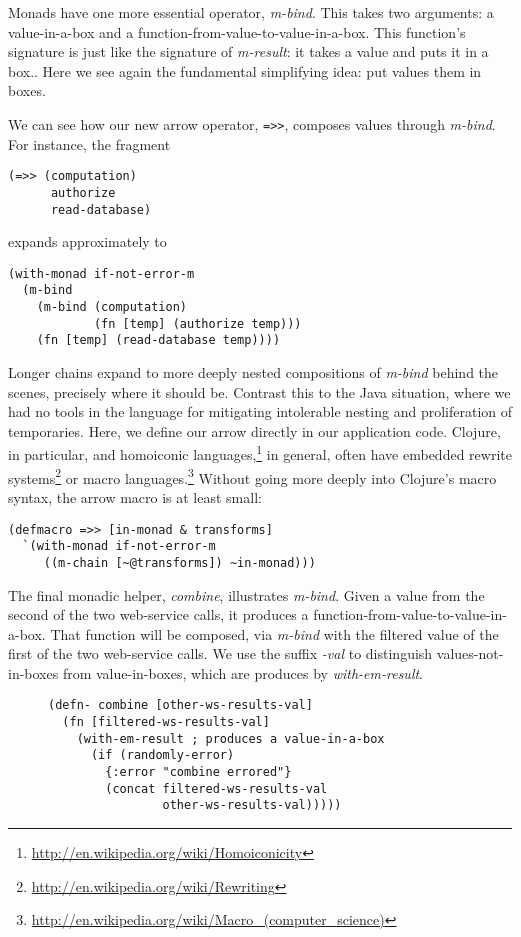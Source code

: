 \documentclass[11pt]{article}
\begin{document}
Monads have one more essential operator, \emph{m-bind}. This takes two
arguments: a value-in-a-box and a
function-from-value-to-value-in-a-box. This function's signature is
just like the signature of \emph{m-result}: it takes a value and puts it
in a box.. Here we see again the fundamental simplifying idea: put
values them in boxes.

We can see how our new arrow operator, \verb|=>>|, composes values
through \emph{m-bind}. For instance, the fragment

\begin{verbatim}
(=>> (computation)
      authorize
      read-database)
\end{verbatim}
expands approximately to
\begin{verbatim}
(with-monad if-not-error-m
  (m-bind
    (m-bind (computation)
            (fn [temp] (authorize temp)))
    (fn [temp] (read-database temp))))
\end{verbatim}
Longer chains expand to more deeply nested compositions of \emph{m-bind}
behind the scenes, precisely where it should be. Contrast this to
the Java situation, where we had no tools in the language for
mitigating intolerable nesting and proliferation of temporaries.
Here, we define our arrow directly in our application code.
Clojure, in particular, and homoiconic
languages,\footnote{\url{http://en.wikipedia.org/wiki/Homoiconicity}} in
general, often have embedded rewrite
systems\footnote{\url{http://en.wikipedia.org/wiki/Rewriting}} or macro
languages.\footnote{\url{http://en.wikipedia.org/wiki/Macro_(computer_science)}}
Without going more deeply into Clojure's macro syntax, the arrow
macro is at least small:
\begin{verbatim}
(defmacro =>> [in-monad & transforms]
  `(with-monad if-not-error-m
     ((m-chain [~@transforms]) ~in-monad)))
\end{verbatim}

The final monadic helper, \emph{combine}, illustrates \emph{m-bind}.
Given a value from the second of the two web-service calls, it
produces a function-from-value-to-value-in-a-box. That function
will be composed, via \emph{m-bind} with the filtered value of the first
of the two web-service calls. We use the suffix \emph{-val} to
distinguish values-not-in-boxes from value-in-boxes, which are
produces by \emph{with-em-result}.
\begin{figure}[H]
\label{monadic-helpers-2}
\begin{verbatim}
(defn- combine [other-ws-results-val]
  (fn [filtered-ws-results-val]
    (with-em-result ; produces a value-in-a-box
      (if (randomly-error)
        {:error "combine errored"}
        (concat filtered-ws-results-val
                other-ws-results-val)))))
\end{verbatim}
\end{figure}
\end{document}
